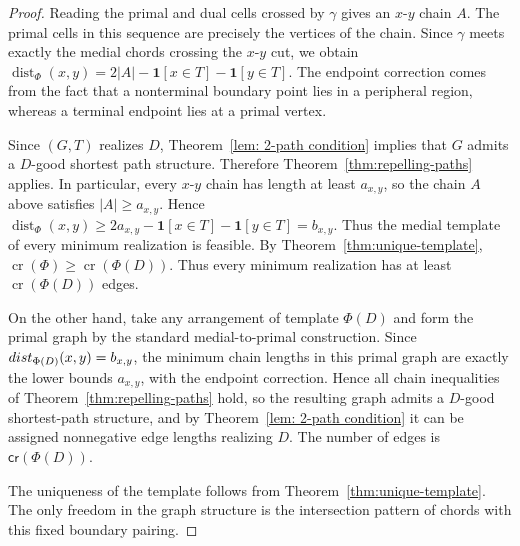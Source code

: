 \documentclass[10pt,a4paper]{amsart}
\newcommand{\cro}{{\mathsf{cr}}}
\newcommand{\dist}{\textnormal{dist}}
\begin{document}
\begin{proof}
Reading the primal and dual cells crossed by $\gamma$ gives an
$x$-$y$ chain $A$.  The primal cells in this sequence are precisely the
vertices of the chain.  Since $\gamma$ meets exactly the medial chords
crossing the $x$-$y$ cut, we obtain
$\operatorname{dist}_{\Phi}(x,y)=
    2|A|-\mathbf 1[x\in T]-\mathbf 1[y\in T]$.
The endpoint correction comes from the fact that a nonterminal boundary
point lies in a peripheral region, whereas a terminal endpoint lies at a
primal vertex.

Since $(G,T)$ realizes $D$, Theorem~\ref{lem: 2-path condition} implies that $G$ admits a
$D$-good shortest path structure.  Therefore Theorem~\ref{thm:repelling-paths} applies.  In
particular, every $x$-$y$ chain has length at least $a_{x,y}$, so the
chain $A$ above satisfies $|A|\ge a_{x,y}$.  Hence
$\operatorname{dist}_{\Phi}(x,y)
    \ge
    2a_{x,y}-\mathbf 1[x\in T]-\mathbf 1[y\in T]
    =
    b_{x,y}$.
Thus the medial template of every minimum realization is feasible.
By Theorem~\ref{thm:unique-template},
$\operatorname{cr}(\Phi)\ge \operatorname{cr}(\Phi(D)).
$
Thus every minimum realization has at least
$\operatorname{cr}(\Phi(D))$ edges.

On the other hand, take any arrangement of template $\Phi(D)$ and form the primal graph by the standard medial-to-primal construction. 
Since $\dist_{\Phi(D)}(x,y)=b_{x,y}$, the minimum chain lengths in this primal graph are exactly the lower bounds $a_{x,y}$, with the endpoint correction.  Hence all chain inequalities of Theorem~\ref{thm:repelling-paths} hold, so the resulting graph admits a $D$-good shortest-path structure, and by Theorem~\ref{lem: 2-path condition} it can be assigned nonnegative edge lengths realizing $D$. The number of edges is $\cro(\Phi(D))$.

The uniqueness of the template follows from Theorem~\ref{thm:unique-template}.  The only freedom in the graph structure is the intersection pattern of chords with this fixed boundary pairing.
\end{proof}
\end{document}

